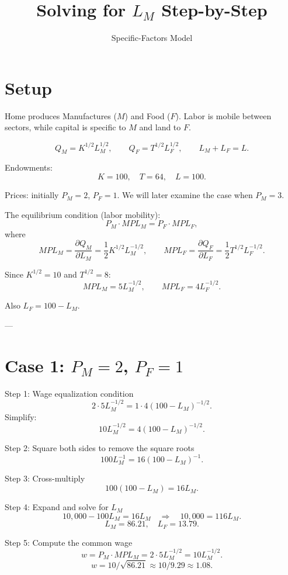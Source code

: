 \documentclass[12pt]{article}
\title{Solving for $L_M$ Step-by-Step}
\author{Specific-Factors Model}
\date{}
\begin{document}
\maketitle

\section*{Setup}

Home produces Manufactures ($M$) and Food ($F$).  
Labor is mobile between sectors, while capital is specific to $M$ and land to $F$.  

\[
Q_M = K^{1/2}L_M^{1/2}, 
\qquad 
Q_F = T^{1/2}L_F^{1/2},
\qquad 
L_M + L_F = L.
\]

Endowments:
\[
K=100, \quad T=64, \quad L=100.
\]

Prices: initially $P_M=2$, $P_F=1$.  
We will later examine the case when $P_M=3$.

\bigskip

\noindent The equilibrium condition (labor mobility):
\[
P_M \cdot MPL_M = P_F \cdot MPL_F,
\]
where
\[
MPL_M = \frac{\partial Q_M}{\partial L_M} = \frac{1}{2}K^{1/2}L_M^{-1/2}, 
\qquad
MPL_F = \frac{\partial Q_F}{\partial L_F} = \frac{1}{2}T^{1/2}L_F^{-1/2}.
\]

Since $K^{1/2}=10$ and $T^{1/2}=8$:
\[
MPL_M = 5L_M^{-1/2}, \qquad MPL_F = 4L_F^{-1/2}.
\]

Also $L_F = 100 - L_M$.

---

\section*{Case 1: $P_M = 2$, $P_F = 1$}

\noindent Step 1: Wage equalization condition
\[
2 \cdot 5L_M^{-1/2} = 1 \cdot 4(100 - L_M)^{-1/2}.
\]
Simplify:
\[
10L_M^{-1/2} = 4(100 - L_M)^{-1/2}.
\]

\bigskip
\noindent Step 2: Square both sides to remove the square roots
\[
100L_M^{-1} = 16(100 - L_M)^{-1}.
\]

\bigskip
\noindent Step 3: Cross-multiply
\[
100(100 - L_M) = 16L_M.
\]

\bigskip
\noindent Step 4: Expand and solve for $L_M$
\[
10{,}000 - 100L_M = 16L_M \quad \Rightarrow \quad 10{,}000 = 116L_M.
\]
\[
\boxed{L_M = 86.21, \quad L_F = 13.79.}
\]

\bigskip
\noindent Step 5: Compute the common wage
\[
w = P_M \cdot MPL_M = 2 \cdot 5L_M^{-1/2} = 10L_M^{-1/2}.
\]
\[
w = 10 / \sqrt{86.21} \approx 10 / 9.29 \approx \boxed{1.08.}
\]
\end{document}
